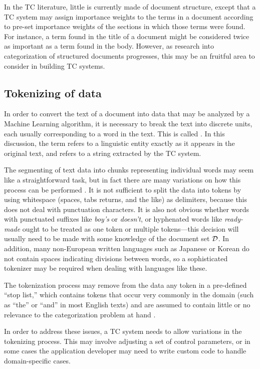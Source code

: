 In the TC literature, little is currently made of document structure,
except that a TC system may assign importance weights to the terms in
a document according to pre-set importance weights of the sections in
which those terms were found.  For instance, a term found in the title
of a document might be considered twice as important as a term found
in the body.  However, as research into categorization of structured
documents progresses, this may be an fruitful area to consider in
building TC systems.

\subsection{Tokenizing of data}

In order to convert the text of a document into data that may be
analyzed by a Machine Learning algorithm, it is necessary to break the
text into discrete units, each usually corresponding to a word in the
text.  This is called .  In this discussion, the
term  refers to a linguistic entity exactly as it appears
in the original text, and  refers to a string extracted by
the TC system.

The segmenting of text data into chunks representing individual words
may seem like a straightforward task, but in fact there are many
variations on how this process
can be performed \cite[sec. 4.2.2]{manning:99}. It is not
sufficient to split the data into tokens by using whitespace (spaces, tabs
returns, and the like) as delimiters, because this does not deal with
punctuation characters.  It is also not obvious whether words with
punctuated suffixes like \emph{boy's} or \emph{doesn't}, or hyphenated words
like \emph{ready-made} ought to be treated as one token or multiple
tokens---this decision will usually need to be made with some
knowledge of the document set $\mathcal{D}$.  In addition, many non-European
written languages such as Japanese or Korean do not contain spaces indicating divisions between
words, so a sophisticated tokenizer may be required when dealing with
languages like these.

The tokenization process 
may remove from the data any token in a
pre-defined ``stop list,'' which contains tokens that occur very
commonly in the domain (such as ``the'' or ``and'' in most English
texts) and are assumed to contain little or no relevance to the
categorization problem at hand \cite[p. 15]{sebastiani:02}
\cite{mladenic:98}.

In order to address these issues, a TC system needs to allow
variations in the tokenizing process.  This may involve adjusting a
set of control parameters, or in some cases the application developer may need to
write custom code to handle domain-specific cases.

